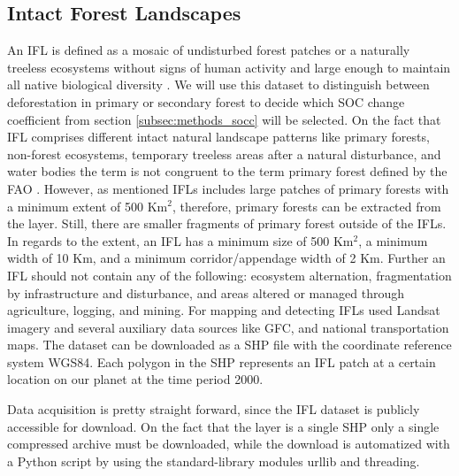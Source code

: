 	\subsection{Intact Forest Landscapes}
		An \ac{IFL} is defined as a mosaic of undisturbed forest patches or a naturally treeless ecosystems without signs of human activity and large enough to maintain all native biological diversity \citep{Potapov2017}. We will use this dataset to distinguish between deforestation in primary or secondary forest to decide which \ac{SOC} change coefficient from section \ref{subsec:methods_socc} will be selected. On the fact that \ac{IFL} comprises different intact natural landscape patterns like primary forests, non-forest ecosystems, temporary treeless areas after a natural disturbance, and water bodies the term is not congruent to the term primary forest defined by the \ac{FAO} \citep{FAO2012}. However, as mentioned \ac{IFL}s includes large patches of primary forests with a minimum extent of 500 Km$^2$, therefore, primary forests can be extracted from the layer. Still, there are smaller fragments of primary forest outside of the \ac{IFL}s. In regards to the extent, an \ac{IFL} has a minimum size of 500 Km$^2$, a minimum width of 10 Km, and a minimum corridor/appendage width of 2 Km. Further an \ac{IFL} should not contain any of the following: ecosystem alternation, fragmentation by infrastructure and disturbance, and areas altered or managed through agriculture, logging, and mining. For mapping and detecting \ac{IFL}s \citeauthor{Potapov2017} used Landsat imagery and several auxiliary data sources like \ac{GFC}, and national transportation maps. The dataset can be downloaded as a \ac{SHP} file with the coordinate reference system \ac{WGS84}. Each polygon in the \ac{SHP} represents an \ac{IFL} patch at a certain location on our planet at the time period 2000.

		Data acquisition is pretty straight forward, since the \ac{IFL} dataset is publicly accessible for download. On the fact that the layer is a single \ac{SHP} only a single compressed archive must be downloaded, while the download is automatized with a Python script by using the standard-library modules urllib and threading.

